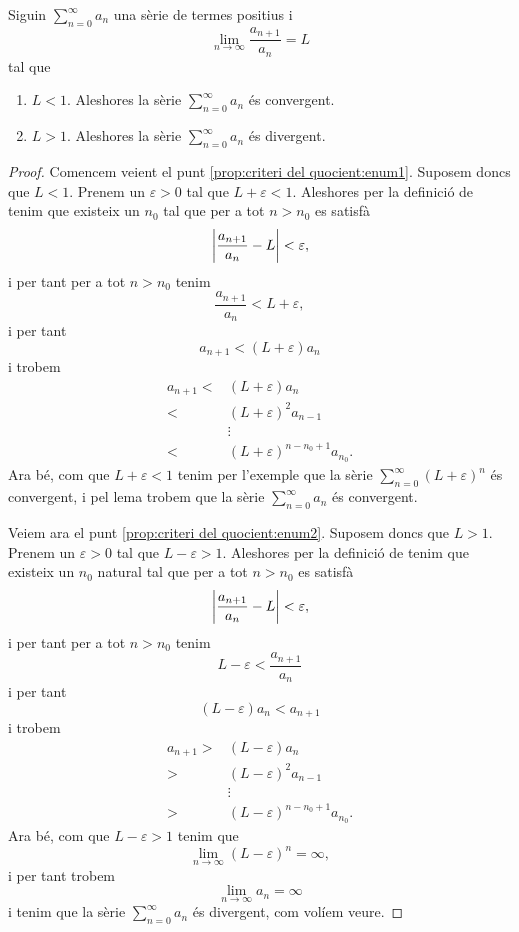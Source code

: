 \documentclass[../Apunts.tex]{subfiles}
\begin{document}
	\begin{proposition}
		\label{prop:criteri del quocient}
		Siguin \(\sum_{n=0}^{\infty}a_{n}\) una sèrie de termes positius i
		\[\lim_{n\to\infty}\frac{a_{n+1}}{a_{n}}=L\]
		tal que
		\begin{enumerate}
			\item\label{prop:criteri del quocient:enum1} \(L<1\). Aleshores la sèrie \(\sum_{n=0}^{\infty}a_{n}\) és convergent.
			\item\label{prop:criteri del quocient:enum2} \(L>1\). Aleshores la sèrie \(\sum_{n=0}^{\infty}a_{n}\) és divergent.
		\end{enumerate}
		\begin{proof}
			Comencem veient el punt \eqref{prop:criteri del quocient:enum1}. Suposem doncs que \(L<1\). Prenem un \(\varepsilon>0\) tal que \(L+\varepsilon<1\). Aleshores per la definició de  tenim que existeix un \(n_{0}\) tal que per a tot \(n>n_{0}\) es satisfà
			\[\abs{\frac{a_{n+1}}{a_{n}}-L}<\varepsilon,\]
			i per tant per a tot \(n>n_{0}\) tenim
			\[\frac{a_{n+1}}{a_{n}}<L+\varepsilon,\]
			i per tant
			\[a_{n+1}<(L+\varepsilon)a_{n}\]
			i trobem
			\begin{align*}
				a_{n+1}<&(L+\varepsilon)a_{n}\\
				<&(L+\varepsilon)^{2}a_{n-1}\\
				&\vdots\\
				<&(L+\varepsilon)^{n-n_{0}+1}a_{n_{0}}.
			\end{align*}
			Ara bé, com que \(L+\varepsilon<1\) tenim per l'exemple  que la sèrie \(\sum_{n=0}^{\infty}(L+\varepsilon)^{n}\) és convergent, i pel lema  trobem que la sèrie \(\sum_{n=0}^{\infty}a_{n}\) és convergent.
			
			Veiem ara el punt \eqref{prop:criteri del quocient:enum2}. Suposem doncs que \(L>1\). Prenem un \(\varepsilon>0\) tal que \(L-\varepsilon>1\). Aleshores per la definició de  tenim que existeix un \(n_{0}\) natural tal que per a tot \(n>n_{0}\) es satisfà
			\[\abs{\frac{a_{n+1}}{a_{n}}-L}<\varepsilon,\]
			i per tant per a tot \(n>n_{0}\) tenim
			\[L-\varepsilon<\frac{a_{n+1}}{a_{n}}\]
			i per tant
			\[(L-\varepsilon)a_{n}<a_{n+1}\]
			i trobem
			\begin{align*}
				a_{n+1}>&(L-\varepsilon)a_{n}\\
				>&(L-\varepsilon)^{2}a_{n-1}\\
				&\vdots\\
				>&(L-\varepsilon)^{n-n_{0}+1}a_{n_{0}}.
			\end{align*}
			Ara bé, com que \(L-\varepsilon>1\) tenim que
			\[\lim_{n\to\infty}(L-\varepsilon)^{n}=\infty,\]
			i per tant trobem
			\[\lim_{n\to\infty}a_{n}=\infty\]
			i tenim que la sèrie \(\sum_{n=0}^{\infty}a_{n}\) és divergent, com volíem veure.
		\end{proof}
	\end{proposition}
\end{document}
